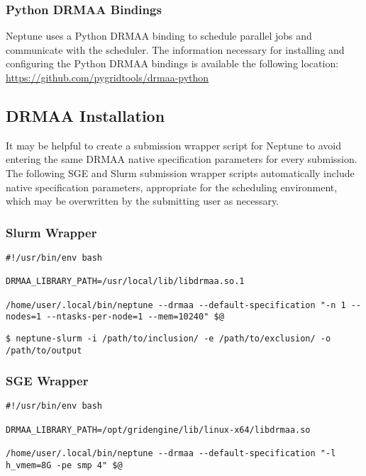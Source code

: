 \documentclass[a4paper,10pt]{article}
\begin{document}
\subsubsection{Python DRMAA Bindings}

Neptune uses a Python DRMAA binding to schedule parallel jobs and communicate with the scheduler. The information necessary for installing and configuring the Python DRMAA bindings is available the following location:
\newline\newline
\url{https://github.com/pygridtools/drmaa-python}

\subsection{DRMAA Installation}

It may be helpful to create a submission wrapper script for Neptune to avoid entering the same DRMAA native specification parameters for every submission. The following SGE and Slurm submission wrapper scripts automatically include native specification parameters, appropriate for the scheduling environment, which may be overwritten by the submitting user as necessary.

\subsubsection{Slurm Wrapper}

\begin{lstlisting}[title={neptune-slurm}]
#!/usr/bin/env bash

DRMAA_LIBRARY_PATH=/usr/local/lib/libdrmaa.so.1

/home/user/.local/bin/neptune --drmaa --default-specification "-n 1 --nodes=1 --ntasks-per-node=1 --mem=10240" $@
\end{lstlisting}

\begin{lstlisting}[title={Slurm Example}]
$ neptune-slurm -i /path/to/inclusion/ -e /path/to/exclusion/ -o /path/to/output
\end{lstlisting}

\subsubsection{SGE Wrapper}

\begin{lstlisting}[title={neptune-sge}]
#!/usr/bin/env bash

DRMAA_LIBRARY_PATH=/opt/gridengine/lib/linux-x64/libdrmaa.so

/home/user/.local/bin/neptune --drmaa --default-specification "-l h_vmem=8G -pe smp 4" $@
\end{lstlisting}
\end{document}

